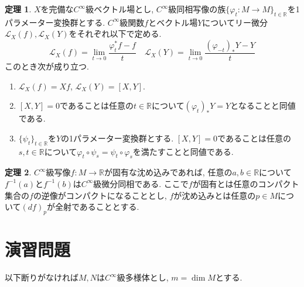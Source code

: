 \documentclass[dvipdfmx,a4paper,11pt]{article}
\newcommand{\R}{\mathbb{R}}
\theoremstyle{definition}
\newtheorem{thm}{定理}
\begin{document}
     \begin{tcolorbox}[
    colback = white,
    colframe = green!35!black,
    fonttitle = \bfseries,
    breakable = true]
    \begin{thm}
    \label{Lie_derivative}
$X$を完備な$C^{\infty}$級ベクトル場とし, $C^{\infty}$級同相写像の族$\{ \varphi_{t} : M \rightarrow M \}_{t \in \R}$を1パラメーター変換群とする.
      $C^{\infty}$級関数$f$とベクトル場$Y$についてリー微分$\mathcal{L}_{X}(f), \mathcal{L}_{X}(Y)$をそれぞれ以下で定める.
      $$
      \mathcal{L}_{X}(f) = \lim_{t \rightarrow 0}\frac{\varphi_{t}^{*} f-f}{t}
      \quad
        \mathcal{L}_{X}(Y) = \lim_{t \rightarrow 0}\frac{(\varphi_{-t})_{*} Y - Y}{t}
      $$
このとき次が成り立つ.
\begin{enumerate}
\setlength{\parskip}{0cm}
  \setlength{\itemsep}{2pt} 
\item $\mathcal{L}_{X}(f)  = Xf$, $\mathcal{L}_{X}(Y)=[X,Y]$.
\item $[X,Y]=0$であることは任意の$t \in \R$について$(\varphi_{t})_{*} Y =Y$となることと同値である.
\item $\{ \psi_{t} \}_{t \in \R}$を$Y$の1パラメーター変換群とする. $[X,Y]=0$であることは任意の$s,t \in \R$について$\varphi_{t} \circ \psi_{s} = \psi_{t} \circ \varphi_{s}$を満たすことと同値である.
\end{enumerate}

    \end{thm}
    \end{tcolorbox}
 
 
 

    \begin{tcolorbox}[
    colback = white,
    colframe = green!35!black,
    fonttitle = \bfseries,
    breakable = true]
\begin{thm}
$C^{\infty}$級写像$f : M\rightarrow \R$が固有な沈め込みであれば, 任意の$a,b \in \R$について$f^{-1}(a)$と$f^{-1}(b)$は$C^{\infty}$級微分同相である. 
ここで$f $が固有とは任意のコンパクト集合の$f$の逆像がコンパクトになることとし, $f$が沈め込みとは任意の$p \in M$について$(df)_{p}$が全射であることとする.
    \end{thm}
    \end{tcolorbox}

\newpage

\section{演習問題}
以下断りがなければ$M,N$は$C^{\infty}$級多様体とし, $m = \dim M$とする.
\end{document}
